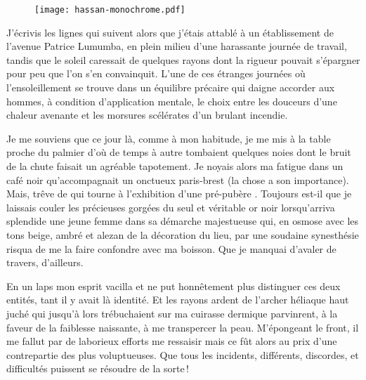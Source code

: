 \begin{figure}[h]
  \centering
  \texttt{[image: hassan-monochrome.pdf]}
  \captionsetup{labelformat=empty}
  \caption[Idéotexte de la tour  (\textarabic{حسان})]{}
\end{figure}

\begin{prose}
  J’écrivis les lignes qui suivent alors que j’étais attablé à un établissement de l’avenue Patrice Lumumba, en plein milieu d’une harassante journée de travail, tandis que le soleil caressait de quelques rayons dont la rigueur pouvait s’épargner pour peu que l’on s’en convainquit.
L’une de ces étranges journées où l’ensoleillement se trouve dans un équilibre précaire qui daigne accorder aux hommes, à condition d’application mentale, le choix entre les douceurs d’une chaleur avenante et les morsures scélérates d’un brulant incendie.

  Je me souviens que ce jour là, comme à mon habitude, je me mis à la table proche du palmier d’où de temps à autre tombaient quelques noies dont le bruit de la chute faisait un agréable tapotement. Je noyais alors ma fatigue dans un café noir qu’accompagnait un onctueux paris-brest (la chose a son importance). Mais, trêve de  qui tourne à l’exhibition d’une  pré-pubère . Toujours est-il que je laissais couler les précieuses gorgées du seul et véritable or noir lorsqu’arriva splendide une jeune femme dans sa démarche majestueuse qui, en osmose avec les tons beige, ambré et alezan de la décoration du lieu, par une soudaine synesthésie risqua de me la faire confondre avec ma boisson. Que je manquai d’avaler de travers, d’ailleurs.

  En un laps mon esprit vacilla et ne put honnêtement plus distinguer ces deux entités, tant il y avait là identité. Et les rayons ardent de l’archer héliaque haut juché qui jusqu’à lors trébuchaient sur ma cuirasse dermique parvinrent, à la faveur de la faiblesse naissante, à me transpercer la peau. M’épongeant le front, il me fallut par de laborieux efforts me ressaisir mais ce fût alors au prix d’une contrepartie des plus voluptueuses. Que tous les incidents, différents, discordes, et difficultés puissent se résoudre de la sorte\,!


\end{prose}
